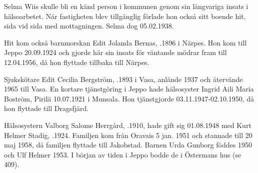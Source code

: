 Selma Wiis skulle bli en känd person i kommunen genom sin långvariga insats i hälsoarbetet. När fastigheten blev tillgänglig förlade hon också sitt boende hit, sida vid sida med mottagningen. Selma dog 05.02.1938.

Hit kom också barnmorskan Edit Jolanda Bernas, .1896 i Närpes. Hon kom till Jeppo 20.09.1924 och gjorde här sin insats för väntande mödrar fram till 12.04.1956, då hon flyttade tillbaka till Närpes.

Sjukskötare Edit Cecilia Bergström, .1893 i Vasa, anlände 1937 och återvände 1965 till Vasa. En kortare tjänstgöring i Jeppo hade hälsosyster Ingrid Aili Maria Boström, \textborn Pirilä 10.07.1921 i Munsala. Hon tjänstgjorde 03.11.1947-02.10.1950, då hon flyttade till Dragsfjärd.

Hälsosystern Valborg Salome Herrgård, .1910, hade gift sig 01.08.1948 med Kurt Helmer Stadig, .1924. Familjen kom  från Oravais 5 jan. 1951 och stannade till 20 maj 1958, då familjen flyttade till Jakobstad. Barnen Urda Gunborg föddes 1950 och Ulf Helmer 1953. I början av tiden i Jeppo bodde de i Östermans hus (se 409).

